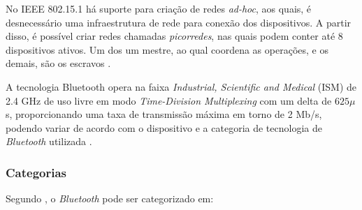 
No IEEE 802.15.1 há suporte para criação de redes \textit{ad-hoc}, aos quais, é desnecessário uma infraestrutura de rede para conexão dos dispositivos. A partir disso, é possível criar redes chamadas \textit{picorredes}, nas quais podem conter até 8 dispositivos ativos. Um dos  um mestre, ao qual coordena as operações, e os demais, são os escravos \cite{BluetoothSIG2017, Kurose2012}.

A tecnologia Bluetooth opera na faixa \textit{Industrial, Scientific and Medical} (ISM) de 2.4 GHz de uso livre em modo \textit{Time-Division Multiplexing} com um delta de $625\mu$s, proporcionando uma taxa de transmissão máxima em torno de 2 Mb/s, podendo variar de acordo com o dispositivo e a categoria de tecnologia de \textit{Bluetooth} utilizada \cite{BluetoothSIG2017}.


\ProximoForaDoSumario %
\subsubsection{Categorias}

Segundo , o \textit{Bluetooth} pode ser categorizado em:

